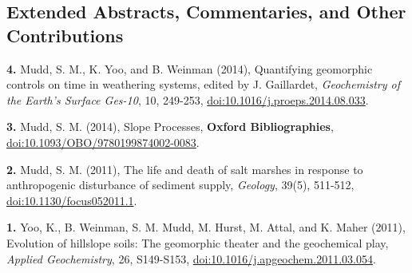 \documentclass[10pt, a4paper]{article}
\newcommand{\years}[1]{\marginnote{\scriptsize #1}}
\begin{document}
\subsection*{Extended Abstracts, Commentaries, and Other Contributions}
\noindent
\years{2014}\hangindent=0.7cm\textbf{4.} Mudd, S. M., K. Yoo, and B. Weinman (2014), Quantifying geomorphic controls on time in weathering systems, edited by J. Gaillardet, \textit{Geochemistry of the Earth's Surface Ges-10}, 10, 249-253, \href{http://dx.doi.org/doi:10.1016/j.proeps.2014.08.033}{doi:10.1016/j.proeps.2014.08.033}.\par
\hangindent=0.7cm\textbf{3.} Mudd, S. M. (2014), Slope Processes, \textbf{Oxford Bibliographies}, \href{http://dx.doi.org/doi:10.1093/OBO/9780199874002-0083}{doi:10.1093/OBO/9780199874002-0083}.\par 
\years{2011}\hangindent=0.7cm\textbf{2.} Mudd, S. M. (2011), The life and death of salt marshes in response to anthropogenic disturbance of sediment supply, \textit{Geology}, 39(5), 511-512, \href{http://dx.doi.org/doi:10.1130/focus052011.1}{doi:10.1130/focus052011.1}.\par
\years{2009}\hangindent=0.7cm\textbf{1.} Yoo, K., B. Weinman, S. M. Mudd, M. Hurst, M. Attal, and K. Maher (2011), Evolution of hillslope soils: The geomorphic theater and the geochemical play, \textit{Applied Geochemistry}, 26, S149-S153, \href{http://dx.doi.org/doi:10.1016/j.apgeochem.2011.03.054}{doi:10.1016/j.apgeochem.2011.03.054}.\par

\vfill{}
\end{document}
